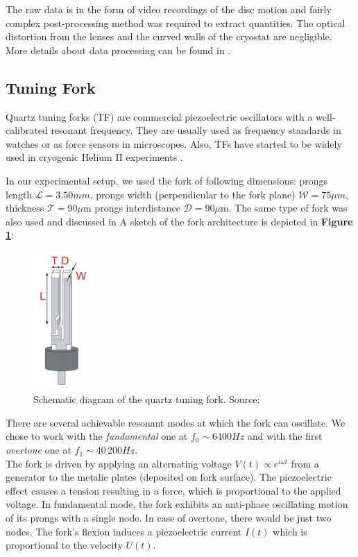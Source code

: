The raw data is in the form of video recordings of the disc motion and fairly complex post-processing method was required to extract quantities. The optical distortion from the lenses and the curved walls of the cryostat are negligible. More details about data processing can be found in \cite{universal_scaling}.

\subsection{Tuning Fork}

Quartz tuning forks (TF) are commercial piezoelectric oscillators with a well-calibrated resonant frequency. They are usually used as frequency standards in watches or as force sensors in microscopes. Also, TFs have started to be widely used in cryogenic Helium II experiments \cite{forks}.

In our experimental setup, we used the fork of following dimensions: prongs length $ \mathcal{L} = 3.50\unit{mm} $, prongs width (perpendicular to the fork plane) $ \mathcal{W}=75 \mu\unit{m} $, thickness $ \mathcal{T}=90\mu\text{m} $ prongs interdistance $ \mathcal{D}=90\mu\text{m} $.
The same type of fork was also used and discussed in \cite{fork-exp} \cite{multiple-vels} A sketch of the fork architecture is depicted in \textbf{Figure \ref{fork}}:

\begin{figure}[h]
	\centering
	\includegraphics[width=0.2\textwidth]{graphics/exp/quartz}
	\caption{Schematic diagram of the quartz tuning fork. Source: \cite{bakalaris}}
	\label{fork}
\end{figure}

There are several achievable resonant modes at which the fork can oscillate. We chose to work with the \textit{fundamental} one at $f_0 \sim 6400 \unit{Hz}$ and with the first \textit{overtone} one at $f_1 \sim 40\,200 \unit{Hz}$.\\
The fork is driven by applying an alternating voltage $V(t) \propto e^{i\omega t}$ from a generator to the metalic plates (deposited on fork surface). The piezoelectric effect causes a tension resulting in a force, which is proportional to the applied voltage. In fundamental mode, the fork exhibits an anti-phase oscillating motion of its prongs with a single node. In case of overtone, there would be just two nodes. The fork's flexion induces a piezoelectric current $I(t)$ which is proportional to the velocity $U(t)$.

